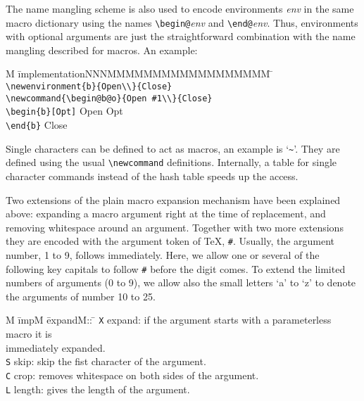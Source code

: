 \documentclass[12pt]{article}
\begin{document}
The name mangling scheme is also used to encode environments {\em
  env\/} in the same macro dictionary using the names
\verb+\begin@+{\em env\/} and \verb+\end@+{\em env}. Thus,
environments with optional arguments are just the straightforward
combination with the name mangling described for macros. An example:

\begin{tabbing}
  M \= implementationNNNMMMMMMMMMMMMMMMMMM \= \kill
  \> \verb+\newenvironment{b}{Open\\}{Close}+ \\
  \> \verb+\newcommand{\begin@b@o}{Open #1\\}{Close}+ \\
  \> \verb+\begin{b}[Opt]+        \> Open Opt\\
  \> \verb+\end{b}+               \> Close
\end{tabbing}

Single characters can be defined to act as macros, an example is
`\verb+~+'.  They are defined using the usual \verb+\newcommand+
definitions. Internally, a table for single character commands instead
of the hash table speeds up the access.

Two extensions of the plain macro expansion mechanism have been
explained above: expanding a macro argument right at the time of
replacement, and removing whitespace around an argument. Together
with two more extensions they are encoded with the argument token of
\TeX, {\tt \#}. Usually, the argument number, 1 to 9, follows
immediately. Here, we allow one or several of the following key
capitals to follow {\tt \#} before the digit comes. To extend the
limited numbers of arguments (0 to 9), we allow also the small letters
`a' to `z' to denote the arguments of number 10 to 25.

\begin{tabbing}
  M \= impM \= expandM:: \= \kill
  \> \verb+X+ \> expand: \> if the argument starts with a parameterless macro 
                            it is\\ \> \> \> immediately expanded.\\
  \> \verb+S+ \> skip:   \> skip the fist character of the argument.\\
  \> \verb+C+ \> crop:   \> removes whitespace on both sides of the 
                            argument.\\
  \> \verb+L+ \> length: \> gives the length of the argument.
\end{tabbing}
\end{document}
